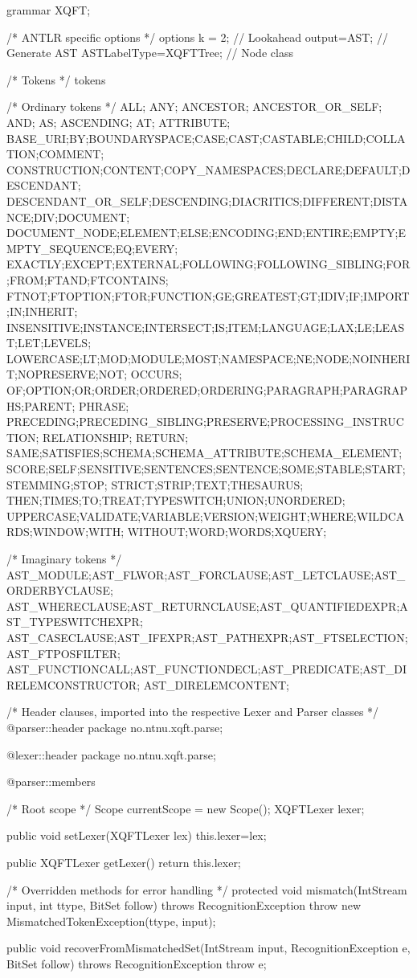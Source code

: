 grammar XQFT;

/* ANTLR specific options */
options { 
    k = 2; // Lookahead
    output=AST; // Generate AST
    ASTLabelType=XQFTTree; // Node class
} 

/* Tokens */
tokens{

  /* Ordinary tokens */
  ALL; ANY; ANCESTOR; ANCESTOR_OR_SELF; AND; AS; ASCENDING; AT; ATTRIBUTE; 
  BASE_URI;BY;BOUNDARYSPACE;CASE;CAST;CASTABLE;CHILD;COLLATION;COMMENT;
  CONSTRUCTION;CONTENT;COPY_NAMESPACES;DECLARE;DEFAULT;DESCENDANT;
  DESCENDANT_OR_SELF;DESCENDING;DIACRITICS;DIFFERENT;DISTANCE;DIV;DOCUMENT;
  DOCUMENT_NODE;ELEMENT;ELSE;ENCODING;END;ENTIRE;EMPTY;EMPTY_SEQUENCE;EQ;EVERY;
  EXACTLY;EXCEPT;EXTERNAL;FOLLOWING;FOLLOWING_SIBLING;FOR;FROM;FTAND;FTCONTAINS;
  FTNOT;FTOPTION;FTOR;FUNCTION;GE;GREATEST;GT;IDIV;IF;IMPORT;IN;INHERIT;
  INSENSITIVE;INSTANCE;INTERSECT;IS;ITEM;LANGUAGE;LAX;LE;LEAST;LET;LEVELS;
  LOWERCASE;LT;MOD;MODULE;MOST;NAMESPACE;NE;NODE;NOINHERIT;NOPRESERVE;NOT;
  OCCURS; OF;OPTION;OR;ORDER;ORDERED;ORDERING;PARAGRAPH;PARAGRAPHS;PARENT;
  PHRASE; PRECEDING;PRECEDING_SIBLING;PRESERVE;PROCESSING_INSTRUCTION;
  RELATIONSHIP; RETURN; SAME;SATISFIES;SCHEMA;SCHEMA_ATTRIBUTE;SCHEMA_ELEMENT;
  SCORE;SELF;SENSITIVE;SENTENCES;SENTENCE;SOME;STABLE;START;STEMMING;STOP;
  STRICT;STRIP;TEXT;THESAURUS; THEN;TIMES;TO;TREAT;TYPESWITCH;UNION;UNORDERED;
  UPPERCASE;VALIDATE;VARIABLE;VERSION;WEIGHT;WHERE;WILDCARDS;WINDOW;WITH;
  WITHOUT;WORD;WORDS;XQUERY;

  /* Imaginary tokens */
  AST_MODULE;AST_FLWOR;AST_FORCLAUSE;AST_LETCLAUSE;AST_ORDERBYCLAUSE;
  AST_WHERECLAUSE;AST_RETURNCLAUSE;AST_QUANTIFIEDEXPR;AST_TYPESWITCHEXPR;
  AST_CASECLAUSE;AST_IFEXPR;AST_PATHEXPR;AST_FTSELECTION;AST_FTPOSFILTER;
  AST_FUNCTIONCALL;AST_FUNCTIONDECL;AST_PREDICATE;AST_DIRELEMCONSTRUCTOR;
  AST_DIRELEMCONTENT;
}

/* Header clauses, imported into the respective Lexer and Parser classes */
@parser::header {
  package no.ntnu.xqft.parse;
}

@lexer::header {
  package no.ntnu.xqft.parse;  
}

@parser::members {

  /* Root scope */
  Scope currentScope = new Scope();
  XQFTLexer lexer;
  
  public void setLexer(XQFTLexer lex)
  {
      this.lexer=lex;
  }
  
  public XQFTLexer getLexer()
  {
      return this.lexer;
  }

  /* Overridden methods for error handling */
  protected void mismatch(IntStream input, int ttype, BitSet follow)
      throws RecognitionException
  {
      throw new MismatchedTokenException(ttype, input);
  }

  public void recoverFromMismatchedSet(IntStream input, 
                                       RecognitionException e, 
                                       BitSet follow)
                  throws RecognitionException
  {
      throw e;
  }

}

